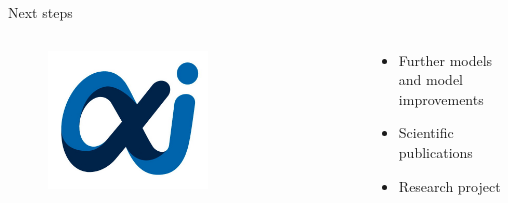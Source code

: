 \documentclass[aspectratio=169]{beamer}
\begin{document}
\begin{frame}{Next steps}
    \pause
    \begin{columns}[T]
        \begin{column}{0.3\textwidth}
            \begin{figure}[H]
                \centering
                \includegraphics[width=0.6\textwidth]{./tex_images/mathai_alfa.jpg}
            \end{figure}
        \end{column}
        \begin{column}{0.65\textwidth}
            \vspace*{0.5cm}
            \begin{itemize}
                \item Further models and model improvements
                \item Scientific publications
                \item Research project
            \end{itemize}
        \end{column}
    \end{columns}
    \pause


\end{frame}
\end{document}
